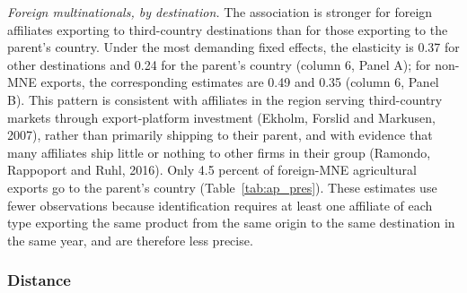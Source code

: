 \documentclass[11pt,a4paper]{article}
\begin{document}
\emph{Foreign multinationals, by destination.} The association is stronger for foreign affiliates
exporting to third-country destinations than for those exporting to the parent's country. Under
the most demanding fixed effects, the elasticity is 0.37 for other destinations and 0.24 for the
parent's country (column 6, Panel A); for non-MNE exports, the corresponding estimates are 0.49 and
0.35 (column 6, Panel B). This pattern is consistent with affiliates in the region serving
third-country markets through export-platform investment (Ekholm, Forslid and Markusen, 2007),
rather than primarily shipping to their parent, and with evidence that many affiliates ship little
or nothing to other firms in their group (Ramondo, Rappoport and Ruhl, 2016). Only 4.5 percent of
foreign-MNE agricultural exports go to the parent's country (Table~\ref{tab:ap_pres}). These
estimates use fewer observations because identification requires at least one affiliate of each
type exporting the same product from the same origin to the same destination in the same year, and
are therefore less precise.

\subsubsection{Distance}
\end{document}
